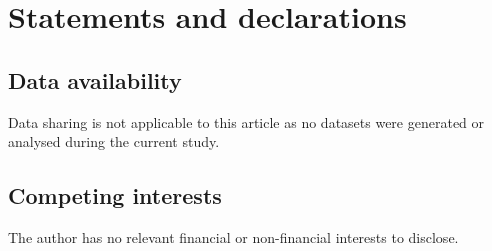 \documentclass[11pt, reqno]{amsart}
\theoremstyle{plain}
\theoremstyle{definition}
\numberwithin{equation}{section}
\begin{document}
\section*{Statements and declarations}
\subsection*{Data availability} Data sharing is not applicable to this article as no datasets were generated or analysed during the current study.

\subsection*{Competing interests} The author has no relevant financial or non-financial interests to disclose.


 
\end{document}
